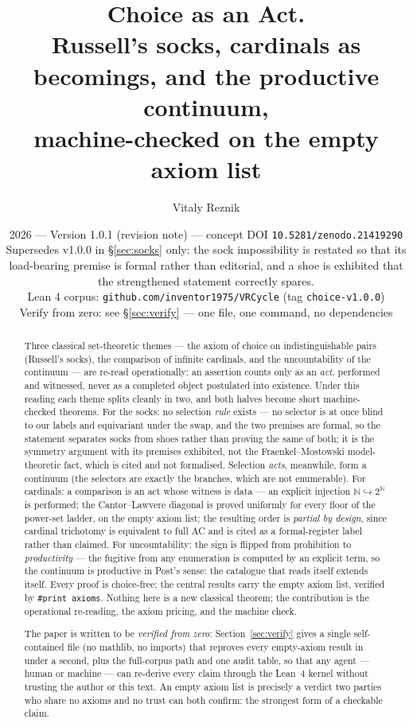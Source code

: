 \documentclass[11pt]{article}
\title{\textbf{Choice as an Act.}\\[2pt]
\large Russell's socks, cardinals as becomings, and the productive
continuum,\\ machine-checked on the empty axiom list}
\author{Vitaly Reznik}
\date{2026 --- Version 1.0.1 (revision note) --- concept DOI
\texttt{10.5281/zenodo.21419290}\\[2pt]
\small Supersedes v1.0.0 in \S\ref{sec:socks} only: the sock impossibility is
restated so that its load-bearing premise is formal rather than editorial, and
a shoe is exhibited that the strengthened statement correctly spares.\\[2pt]
\small Lean 4 corpus: \texttt{github.com/inventor1975/VRCycle} (tag
\texttt{choice-v1.0.0})\\
\small Verify from zero: see \S\ref{sec:verify} --- one file, one command,
no dependencies}
\theoremstyle{remark}
\newcommand{\N}{\mathbb{N}}
\begin{document}
\maketitle

\begin{abstract}
Three classical set-theoretic themes --- the axiom of choice on
indistinguishable pairs (Russell's socks), the comparison of infinite
cardinals, and the uncountability of the continuum --- are re-read
operationally: an assertion counts only as an \emph{act}, performed and
witnessed, never as a completed object postulated into existence.  Under
this reading each theme splits cleanly in two, and both halves become
short machine-checked theorems.  For the socks: no selection \emph{rule}
exists --- no selector is at once blind to our labels and equivariant
under the swap, and the two premises are formal, so the statement
separates socks from shoes rather than proving the same of both; it is
the symmetry argument with its premises exhibited, not the
Fraenkel--Mostowski model-theoretic fact, which is cited and not
formalised.  Selection \emph{acts}, meanwhile, form a continuum
(the selectors are exactly the branches, which are not enumerable).  For
cardinals: a comparison is an act whose witness is data --- an explicit
injection $\N \hookrightarrow 2^{\N}$ is performed; the Cantor--Lawvere
diagonal is proved uniformly for every floor of the power-set ladder, on
the empty axiom list; the resulting order is \emph{partial by design},
since cardinal trichotomy is equivalent to full AC and is cited as a
formal-register label rather than claimed.  For uncountability: the sign
is flipped from prohibition to \emph{productivity} --- the fugitive from
any enumeration is computed by an explicit term, so the continuum is
productive in Post's sense: the catalogue that reads itself extends
itself.  Every proof is choice-free; the central results carry the empty
axiom list, verified by \texttt{\#print axioms}.  Nothing here is a new
classical theorem; the contribution is the operational re-reading, the
axiom pricing, and the machine check.

The paper is written to be \emph{verified from zero}: Section~\ref{sec:verify}
gives a single self-contained file (no mathlib, no imports) that reproves
every empty-axiom result in under a second, plus the full-corpus path and
one audit table, so that any agent --- human or machine --- can re-derive
every claim through the Lean~4 kernel without trusting the author or this
text.  An empty axiom list is precisely a verdict two parties who share
no axioms and no trust can both confirm: the strongest form of a
checkable claim.
\end{abstract}
\end{document}
